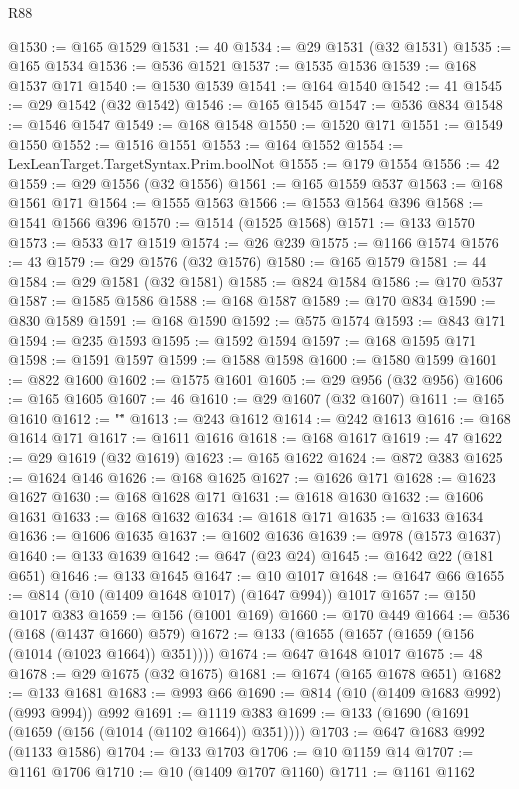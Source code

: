 \begin{lexlean}{R88}
\begin{coremodule}
@1530 := @165 @1529
@1531 := 40
@1534 := @29 @1531 (@32 @1531)
@1535 := @165 @1534
@1536 := @536 @1521
@1537 := @1535 @1536
@1539 := @168 @1537 @171
@1540 := @1530 @1539
@1541 := @164 @1540
@1542 := 41
@1545 := @29 @1542 (@32 @1542)
@1546 := @165 @1545
@1547 := @536 @834
@1548 := @1546 @1547
@1549 := @168 @1548
@1550 := @1520 @171
@1551 := @1549 @1550
@1552 := @1516 @1551
@1553 := @164 @1552
@1554 := LexLeanTarget.TargetSyntax.Prim.boolNot
@1555 := @179 @1554
@1556 := 42
@1559 := @29 @1556 (@32 @1556)
@1561 := @165 @1559 @537
@1563 := @168 @1561 @171
@1564 := @1555 @1563
@1566 := @1553 @1564 @396
@1568 := @1541 @1566 @396
@1570 := @1514 (@1525 @1568)
@1571 := @133 @1570
@1573 := @533 @17 @1519
@1574 := @26 @239
@1575 := @1166 @1574
@1576 := 43
@1579 := @29 @1576 (@32 @1576)
@1580 := @165 @1579
@1581 := 44
@1584 := @29 @1581 (@32 @1581)
@1585 := @824 @1584
@1586 := @170 @537
@1587 := @1585 @1586
@1588 := @168 @1587
@1589 := @170 @834
@1590 := @830 @1589
@1591 := @168 @1590
@1592 := @575 @1574
@1593 := @843 @171
@1594 := @235 @1593
@1595 := @1592 @1594
@1597 := @168 @1595 @171
@1598 := @1591 @1597
@1599 := @1588 @1598
@1600 := @1580 @1599
@1601 := @822 @1600
@1602 := @1575 @1601
@1605 := @29 @956 (@32 @956)
@1606 := @165 @1605
@1607 := 46
@1610 := @29 @1607 (@32 @1607)
@1611 := @165 @1610
@1612 := "\""
@1613 := @243 @1612
@1614 := @242 @1613
@1616 := @168 @1614 @171
@1617 := @1611 @1616
@1618 := @168 @1617
@1619 := 47
@1622 := @29 @1619 (@32 @1619)
@1623 := @165 @1622
@1624 := @872 @383
@1625 := @1624 @146
@1626 := @168 @1625
@1627 := @1626 @171
@1628 := @1623 @1627
@1630 := @168 @1628 @171
@1631 := @1618 @1630
@1632 := @1606 @1631
@1633 := @168 @1632
@1634 := @1618 @171
@1635 := @1633 @1634
@1636 := @1606 @1635
@1637 := @1602 @1636
@1639 := @978 (@1573 @1637)
@1640 := @133 @1639
@1642 := @647 (@23 @24)
@1645 := @1642 @22 (@181 @651)
@1646 := @133 @1645
@1647 := @10 @1017
@1648 := @1647 @66
@1655 := @814 (@10 (@1409 @1648 @1017) (@1647 @994)) @1017
@1657 := @150 @1017 @383
@1659 := @156 (@1001 @169)
@1660 := @170 @449
@1664 := @536 (@168 (@1437 @1660) @579)
@1672 := @133 (@1655 (@1657 (@1659 (@156 (@1014 (@1023 @1664)) @351))))
@1674 := @647 @1648 @1017
@1675 := 48
@1678 := @29 @1675 (@32 @1675)
@1681 := @1674 (@165 @1678 @651)
@1682 := @133 @1681
@1683 := @993 @66
@1690 := @814 (@10 (@1409 @1683 @992) (@993 @994)) @992
@1691 := @1119 @383
@1699 := @133 (@1690 (@1691 (@1659 (@156 (@1014 (@1102 @1664)) @351))))
@1703 := @647 @1683 @992 (@1133 @1586)
@1704 := @133 @1703
@1706 := @10 @1159 @14
@1707 := @1161 @1706
@1710 := @10 (@1409 @1707 @1160)
@1711 := @1161 @1162

\end{coremodule}
\end{lexlean}
